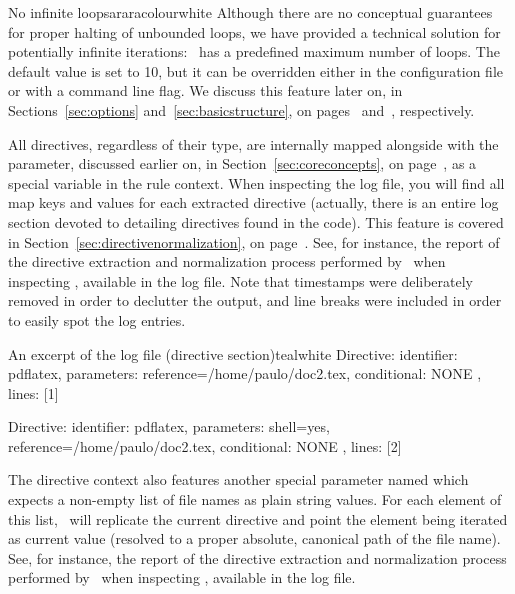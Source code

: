 \begin{messagebox}{No infinite loops}{araracolour}{\icinfo}{white}
Although there are no conceptual guarantees for proper halting of unbounded loops, we have provided a technical solution for potentially infinite iterations: \arara\ has a predefined maximum number of loops. The default value is set to 10, but it can be overridden either in the configuration file or with a command line flag. We discuss this feature later on, in Sections~\ref{sec:options} and~\ref{sec:basicstructure}, on pages~\pageref{sec:options} and~\pageref{sec:basicstructure}, respectively.
\end{messagebox}

All directives, regardless of their type, are internally mapped alongside with the  parameter, discussed earlier on, in Section~\ref{sec:coreconcepts}, on page~\pageref{sec:coreconcepts}, as a special variable in the rule context. When inspecting the log file, you will find all map keys and values for each extracted directive (actually, there is an entire log section devoted to detailing directives found in the code). This feature is covered in Section~\ref{sec:directivenormalization}, on page~\pageref{sec:directivenormalization}. See, for instance, the report of the directive extraction and normalization process performed by \arara\ when inspecting , available in the log file. Note that timestamps were deliberately removed in order to declutter the output, and line breaks were included in order to easily spot the log entries.


\begin{codebox}{An excerpt of the log file (directive section)}{teal}{\icnote}{white}
Directive: { identifier: pdflatex, parameters:
{reference=/home/paulo/doc2.tex},
conditional: { NONE }, lines: [1] }

Directive: { identifier: pdflatex, parameters:
{shell=yes, reference=/home/paulo/doc2.tex},
conditional: { NONE }, lines: [2] }
\end{codebox}

The directive context also features another special parameter named  which expects a non-empty list of file names as plain string values. For each element of this list, \arara\ will replicate the current directive and point the element being iterated as current  value (resolved to a proper absolute, canonical path of the file name). See, for instance, the report of the directive extraction and normalization process performed by \arara\ when inspecting , available in the log file.

